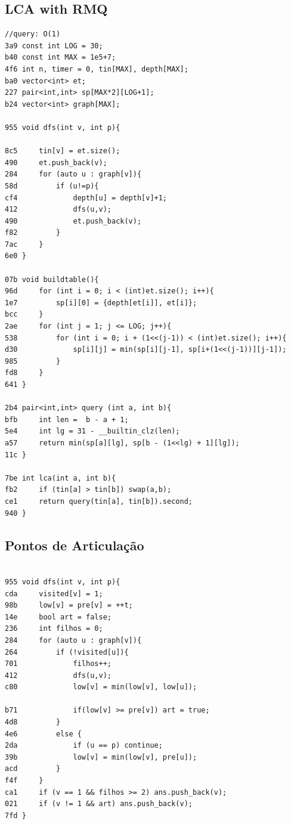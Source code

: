 \documentclass[11pt, a4paper, twoside]{article}
\begin{document}
\subsection{LCA with RMQ}
\begin{lstlisting}
//query: O(1)
3a9 const int LOG = 30;
b40 const int MAX = 1e5+7;
4f6 int n, timer = 0, tin[MAX], depth[MAX];
ba0 vector<int> et;
227 pair<int,int> sp[MAX*2][LOG+1];
b24 vector<int> graph[MAX];

955 void dfs(int v, int p){
        
8c5     tin[v] = et.size();
490     et.push_back(v);
284     for (auto u : graph[v]){
58d         if (u!=p){
cf4             depth[u] = depth[v]+1;
412             dfs(u,v);
490             et.push_back(v);
f82         }
7ac     }
6e0 }

07b void buildtable(){
96d     for (int i = 0; i < (int)et.size(); i++){
1e7         sp[i][0] = {depth[et[i]], et[i]};
bcc     }
2ae     for (int j = 1; j <= LOG; j++){
538         for (int i = 0; i + (1<<(j-1)) < (int)et.size(); i++){
d30             sp[i][j] = min(sp[i][j-1], sp[i+(1<<(j-1))][j-1]);
985         }
fd8     }
641 }

2b4 pair<int,int> query (int a, int b){
bfb     int len =  b - a + 1;
5e4     int lg = 31 - __builtin_clz(len);
a57     return min(sp[a][lg], sp[b - (1<<lg) + 1][lg]);
11c }

7be int lca(int a, int b){
fb2     if (tin[a] > tin[b]) swap(a,b);
ce1     return query(tin[a], tin[b]).second;
940 }
\end{lstlisting}

\subsection{Pontos de Articulação}
\begin{lstlisting}

955 void dfs(int v, int p){
cda     visited[v] = 1;
98b     low[v] = pre[v] = ++t;
14e     bool art = false;
236     int filhos = 0;
284     for (auto u : graph[v]){
264         if (!visited[u]){
701             filhos++;
412             dfs(u,v);
c80             low[v] = min(low[v], low[u]);
    
b71             if(low[v] >= pre[v]) art = true;
4d8         }   
4e6         else {
2da             if (u == p) continue;
39b             low[v] = min(low[v], pre[u]);
acd         }
f4f     }
ca1     if (v == 1 && filhos >= 2) ans.push_back(v);
021     if (v != 1 && art) ans.push_back(v);
7fd }
\end{lstlisting}
\end{document}
